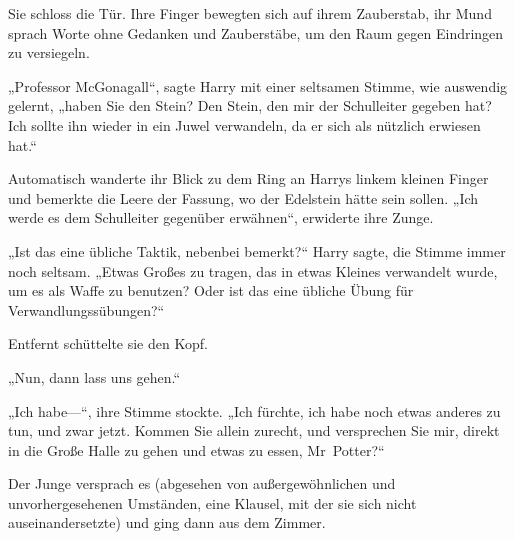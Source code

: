 
Sie schloss die Tür. Ihre Finger bewegten sich auf ihrem Zauberstab, ihr Mund sprach Worte ohne Gedanken und Zauberstäbe, um den Raum gegen Eindringen zu versiegeln.

„Professor McGonagall“, sagte Harry mit einer seltsamen Stimme, wie auswendig gelernt, „haben Sie den Stein? Den Stein, den mir der Schulleiter gegeben hat? Ich sollte ihn wieder in ein Juwel verwandeln, da er sich als nützlich erwiesen hat.“

Automatisch wanderte ihr Blick zu dem Ring an Harrys linkem kleinen Finger und bemerkte die Leere der Fassung, wo der Edelstein hätte sein sollen.
„Ich werde es dem Schulleiter gegenüber erwähnen“, erwiderte ihre Zunge.

„Ist das eine übliche Taktik, nebenbei bemerkt?“ Harry sagte, die Stimme immer noch seltsam. „Etwas Großes zu tragen, das in etwas Kleines verwandelt wurde, um es als Waffe zu benutzen? Oder ist das eine übliche Übung für Verwandlungssübungen?“

Entfernt schüttelte sie den Kopf.

„Nun, dann lass uns gehen.“

„Ich habe—“, ihre Stimme stockte. „Ich fürchte, ich habe noch etwas anderes zu tun, und zwar jetzt. Kommen Sie allein zurecht, und versprechen Sie mir, direkt in die Große Halle zu gehen und etwas zu essen, Mr~Potter?“

Der Junge versprach es (abgesehen von außergewöhnlichen und unvorhergesehenen Umständen, eine Klausel, mit der sie sich nicht auseinandersetzte) und ging dann aus dem Zimmer.


